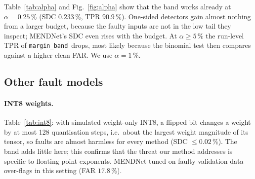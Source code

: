 \documentclass[10pt,a4paper]{article}
\newcommand{\meth}[1]{\texttt{#1}}
\newcommand{\ours}{\meth{margin\_band}}
\begin{document}
Table~\ref{tab:alpha} and Fig.~\ref{fig:alpha} show that the band works already at $\alpha=0.25\,\%$
(SDC $0.233\,\%$, TPR $90.9\,\%$). One-sided detectors gain almost nothing from a larger budget, because the
faulty inputs are not in the low tail they inspect; MENDNet's SDC even rises with the budget. At $\alpha\ge5\,\%$ the run-level TPR of \ours\ drops, most
likely because the binomial test then compares against a higher clean FAR. We use $\alpha=1\,\%$.

\subsection{Other fault models}

\paragraph{INT8 weights.} Table~\ref{tab:int8}: with simulated weight-only INT8, a flipped bit changes a
weight by at most 128 quantisation steps, i.e.\ about the largest weight magnitude of its tensor, so faults are almost harmless for every method
(SDC $\le 0.02\,\%$). The band adds little here; this confirms that the threat our method addresses is
specific to floating-point exponents. MENDNet tuned on faulty validation data over-flags in this setting
(FAR $17.8\,\%$).
\end{document}
